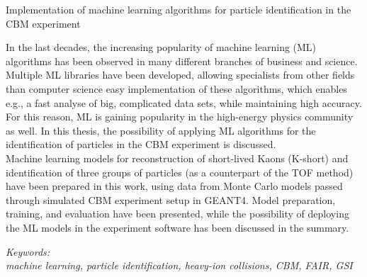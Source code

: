 \begin{description}[leftmargin=3.2cm,font=\normalfont]
\item[Title of the thesis:] Implementation of machine learning algorithms for particle identification in the CBM experiment
\end{description}

In the last decades, the increasing popularity of machine learning (ML) algorithms has been observed in many different branches of business and science. 
Multiple ML libraries have been developed, allowing specialists from other fields than computer science easy implementation of these algorithms, which enables e.g., a fast analyse of big, complicated data sets, while maintaining high accuracy. 
For this reason, ML is gaining popularity in the high-energy physics community as well. 
In this thesis, the possibility of applying ML algorithms for the identification of particles in the CBM experiment is discussed.\\

Machine learning models for reconstruction of short-lived Kaons (K-short) and identification of three groups of particles (as a counterpart of the TOF method) have been prepared in this work, using data from Monte Carlo models passed through simulated CBM experiment setup in GEANT4. Model preparation, training, and evaluation have been presented, while the possibility of deploying the ML models in the experiment software has been discussed in the summary.




\vspace{0.025\textheight}
\textit{Keywords:}\\
\textit{machine learning, particle identification, heavy-ion collisions, CBM, FAIR, GSI}